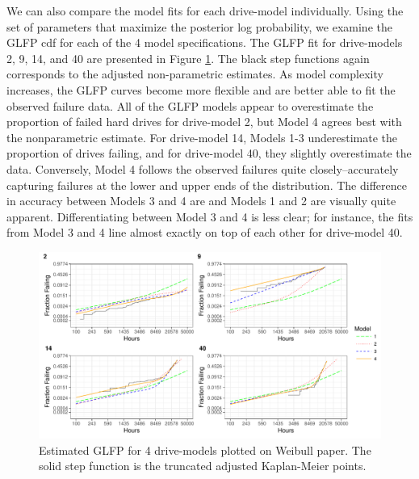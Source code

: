 \documentclass[12pt]{article}
\begin{document}
We can also compare the model fits for each drive-model individually.  Using the set of parameters that maximize the posterior log probability, we examine the GLFP cdf for each of the 4 model specifications.  The GLFP fit for drive-models 2, 9, 14, and 40 are presented in Figure \ref{fig:mod_comp_leg}.  The black step functions again corresponds to the adjusted non-parametric estimates.  As model complexity increases, the GLFP curves become more flexible and are better able to fit the observed failure data.  All of the GLFP models appear to overestimate the proportion of failed hard drives for drive-model 2, but Model 4 agrees best with the nonparametric estimate.  For drive-model 14, Models 1-3 underestimate the proportion of drives failing, and for drive-model 40, they slightly overestimate the data.  Conversely, Model 4 follows the observed failures quite closely--accurately capturing failures at the lower and upper ends of the distribution.  The difference in accuracy between Models 3 and 4 are and Models 1 and 2 are visually quite apparent.  Differentiating between Model 3 and 4 is less clear; for instance, the fits from Model 3 and 4 line almost exactly on top of each other for drive-model 40.
\begin{figure}[H]
    \centering
   \includegraphics[width=\textwidth]{mod_compare_legend}
		\caption{Estimated GLFP for 4 drive-models plotted on Weibull paper.  The solid step function is the truncated adjusted Kaplan-Meier points.  \label{fig:mod_comp_leg}} 
\end{figure}
\end{document}
